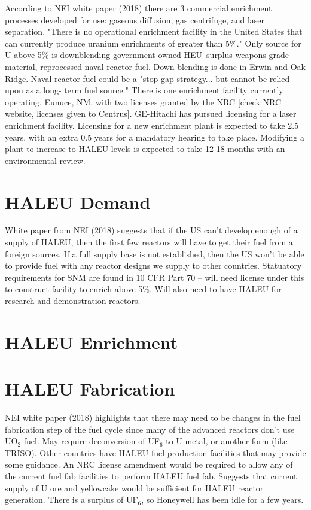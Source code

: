 \documentclass{article}
\begin{document}
According to NEI white paper (2018) there are 3 commercial enrichment 
processes developed for use: gaseous diffusion, gas centrifuge, and laser 
separation. "There is no operational enrichment facility in the 
United States that can currently produce uranium enrichments of greater
than 5\%." Only source for U above 5\% is downblending government 
owned HEU--surplus weapons grade material, reprocessed naval reactor
fuel. Down-blending is done in Erwin and Oak Ridge. Naval reactor fuel 
could be a "stop-gap strategy... but cannot be relied upon as a long-
term fuel source." There is one enrichment facility currently 
operating, Eunuce, NM, with two licenses granted by the NRC [check 
NRC website, licenses given to Centrus]. GE-Hitachi has pursued 
licensing for a laser enrichment facility. Licensing for a new 
enrichment plant is expected to take 2.5 years, with an extra 0.5 
years for a mandatory hearing to take place. Modifying a plant to 
increase to HALEU levels is expected to take 12-18 months with an 
environmental review. 

\section{HALEU Demand}
White paper from NEI (2018) suggests that if the US can't develop 
enough of a supply of HALEU, then the first few reactors will have 
to get their fuel from a foreign sources. If a full supply base 
is not established, then the US won't be able to provide fuel 
with any reactor designs we supply to other countries. Statuatory
requirements for SNM are found in 10 CFR Part 70 -- will need license 
under this to construct facility to enrich above 5\%. Will also need 
to have HALEU for research and demonstration reactors. 

\section{HALEU Enrichment}

\section{HALEU Fabrication}
NEI white paper (2018) highlights that there may need to be changes 
in the fuel fabrication step of the fuel cycle since many of the 
advanced reactors don't use UO$_2$ fuel. May require deconversion 
of UF$_6$ to U metal, or another form (like TRISO). Other countries 
have HALEU fuel production facilities that may provide some guidance. 
An NRC license amendment would be required to allow any of the 
current fuel fab facilities to perform HALEU fuel fab. Suggests 
that current supply of U ore and yellowcake would be sufficient for 
HALEU reactor generation. There is a surplus of UF$_6$, so Honeywell 
has been idle for a few years. 
\end{document}
